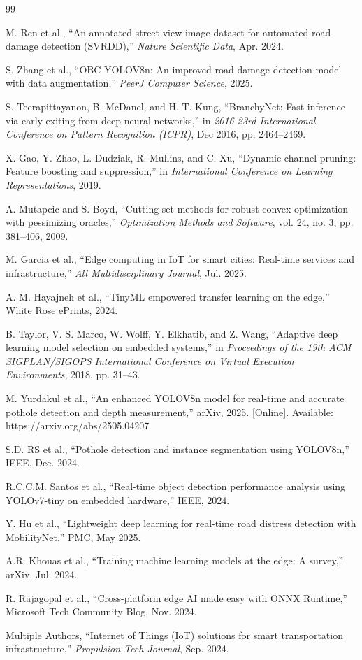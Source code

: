 \documentclass{ieeeaccess}
\begin{document}
\begin{thebibliography}{99}

M. Ren et al., ``An annotated street view image dataset for automated road damage detection (SVRDD),'' \textit{Nature Scientific Data}, Apr. 2024.

S. Zhang et al., ``OBC-YOLOV8n: An improved road damage detection model with data augmentation,'' \textit{PeerJ Computer Science}, 2025.

S. Teerapittayanon, B. McDanel, and H. T. Kung, ``BranchyNet: Fast inference via early exiting from deep neural networks,'' in \textit{2016 23rd International Conference on Pattern Recognition (ICPR)}, Dec 2016, pp. 2464--2469.

X. Gao, Y. Zhao, L. Dudziak, R. Mullins, and C. Xu, ``Dynamic channel pruning: Feature boosting and suppression,'' in \textit{International Conference on Learning Representations}, 2019.

A. Mutapcic and S. Boyd, ``Cutting-set methods for robust convex optimization with pessimizing oracles,'' \textit{Optimization Methods and Software}, vol. 24, no. 3, pp. 381--406, 2009.

M. Garcia et al., ``Edge computing in IoT for smart cities: Real-time services and infrastructure,'' \textit{All Multidisciplinary Journal}, Jul. 2025.

A. M. Hayajneh et al., ``TinyML empowered transfer learning on the edge,'' White Rose ePrints, 2024.

B. Taylor, V. S. Marco, W. Wolff, Y. Elkhatib, and Z. Wang, ``Adaptive deep learning model selection on embedded systems,'' in \textit{Proceedings of the 19th ACM SIGPLAN/SIGOPS International Conference on Virtual Execution Environments}, 2018, pp. 31--43.

M. Yurdakul et al., ``An enhanced YOLOV8n model for real-time and accurate pothole detection and depth measurement,'' arXiv, 2025. [Online]. Available: https://arxiv.org/abs/2505.04207

S.D. RS et al., ``Pothole detection and instance segmentation using YOLOV8n,'' IEEE, Dec. 2024.

R.C.C.M. Santos et al., ``Real-time object detection performance analysis using YOLOv7-tiny on embedded hardware,'' IEEE, 2024.

Y. Hu et al., ``Lightweight deep learning for real-time road distress detection with MobilityNet,'' PMC, May 2025.

A.R. Khouas et al., ``Training machine learning models at the edge: A survey,'' arXiv, Jul. 2024.

R. Rajagopal et al., ``Cross-platform edge AI made easy with ONNX Runtime,'' Microsoft Tech Community Blog, Nov. 2024.

Multiple Authors, ``Internet of Things (IoT) solutions for smart transportation infrastructure,'' \textit{Propulsion Tech Journal}, Sep. 2024.

\end{thebibliography}
\end{document}
